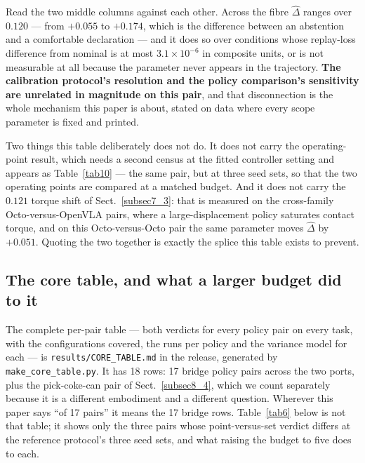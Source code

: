 \documentclass[pdflatex,iicol,sn-apa]{sn-jnl}
\theoremstyle{remark}
\begin{document}
Read the two middle columns against each other. Across the fibre $\hat\Delta$ ranges over
$0.120$ --- from $+0.055$ to $+0.174$, which is the difference between an abstention and a
comfortable declaration --- and it does so over conditions whose replay-loss difference from nominal
is at most $3.1\times10^{-6}$ in composite units, or is not measurable at all because the parameter
never appears in the trajectory. \textbf{The calibration protocol's resolution and the policy
comparison's sensitivity are unrelated in magnitude on this pair}, and that disconnection is the
whole mechanism this paper is about, stated on data where every scope parameter is fixed and printed.

Two things this table deliberately does not do. It does not carry the operating-point result, which
needs a second census at the fitted controller setting and appears as Table~\ref{tab10} --- the same
pair, but at three seed sets, so that the two operating points are compared at a matched budget. And
it does not carry the $0.121$ torque shift of Sect.~\ref{subsec7_3}: that is measured on the
cross-family Octo-versus-OpenVLA pairs, where a large-displacement policy saturates contact torque,
and on this Octo-versus-Octo pair the same parameter moves $\hat\Delta$ by $+0.051$. Quoting the
two together is exactly the splice this table exists to prevent.

\subsection{The core table, and what a larger budget did to it}\label{subsec7_2}

The complete per-pair table --- both verdicts for every policy pair on every task, with the
configurations covered, the runs per policy and the variance model for each --- is
\texttt{results/CORE\_TABLE.md} in the release, generated by \texttt{make\_core\_table.py}. It has 18
rows: 17 bridge policy pairs across the two ports, plus the pick-coke-can pair of
Sect.~\ref{subsec8_4}, which we count separately because it is a different embodiment and a
different question. Wherever this paper says ``of 17 pairs'' it means the 17 bridge rows.
Table~\ref{tab6} below is not that table; it shows only the three pairs whose point-versus-set
verdict differs at the reference protocol's three seed sets, and what raising the budget to five
does to each.
\end{document}

